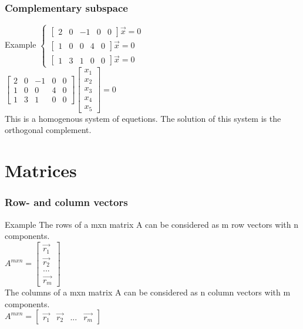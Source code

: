 \begin{frame}
	\frametitle{Complementary subspace}
	\begin{block}{Example}
		$\begin{cases}
		\begin{bmatrix} 2 & 0 & -1 & 0 & 0 \end{bmatrix} \overrightarrow{x}=0\\
		\begin{bmatrix} 1 & 0 & 0 & 4 & 0 \end{bmatrix} \overrightarrow{x}=0\\
		\begin{bmatrix} 1 & 3 & 1 & 0 & 0 \end{bmatrix} \overrightarrow{x}=0
		\end{cases}$\\
		$\begin{bmatrix} 
		2 & 0 & -1 & 0 & 0\\
		1 & 0 & 0 & 4 & 0\\
		1 & 3 & 1 & 0 & 0
		\end{bmatrix} 
		\begin{bmatrix}
		x_1\\ x_2\\ x_3\\ x_4\\ x_5
		\end{bmatrix}=0$\\
		This is a homogenous system of equetions. The solution of this system is the orthogonal complement. 	
	\end{block}
\end{frame}


\section{Matrices}

\begin{frame}
	\frametitle{Row- and column vectors}
	\begin{block}{Example}
		The rows of a mxn matrix A can be considered as m row vectors with n components.\\
		$A^{mxn}=\begin{bmatrix} \overrightarrow{r_1}\\ \overrightarrow{r_2}\\ ...\\\overrightarrow{r_m}\end{bmatrix}$\\
		The columns of a mxn matrix A can be considered as n column vectors with m components.\\
		$A^{mxn}=\begin{bmatrix} \overrightarrow{r_1}& \overrightarrow{r_2}& ...& \overrightarrow{r_m}\end{bmatrix}$
	\end{block}
\end{frame}

